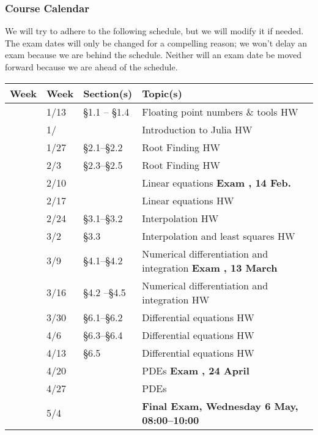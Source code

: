 \documentclass[12pt,fullpage]{article}
\newcounter{qz}\setcounter{qz}{0}
\newcommand{\qz}{%
\setcounter{qz}{\value{qz}+1}
\theqz \,\,}
\newcounter{ex}\setcounter{ex}{0}
\newcommand{\ex}{%
\setcounter{ex}{\value{ex}+1}
Exam \theex}
\newcounter{wk}\setcounter{wk}{0}
\newcommand{\wk}{%
\setcounter{wk}{\value{wk}+1}
\thewk \,\,}
\begin{document}

\subsubsection*{Course Calendar}

We will try to adhere to the following schedule, but we will modify it
if needed. The exam dates will only be changed for a compelling
reason; we won't delay an exam because we are behind the
schedule. Neither will an exam date be moved forward because we are
ahead of the schedule.

\vspace{0.1in}

\begin{center}

\begin{tabular}  {|l|l|l|l|}
\hline
{\bf Week}  & {\bf Week} &  {\bf Section(s)} & {\bf Topic(s)} \\
\hline \hline 
\wk    & 1/13 &    \S1.1 -- \S1.4  & Floating point numbers \& tools \hfill HW \phantom{1}\qz \\
\wk    & 1/ &      & Introduction to Julia  \hfill HW \phantom{1}\qz \\
\wk    & 1/27 &    \S2.1--\S2.2 & Root Finding  \hfill HW \phantom{1}\qz \\
\wk    & 2/3  & \S2.3--\S2.5 &  Root Finding   \hfill HW \phantom{1}\qz \\
\wk    & 2/10 &     &  Linear equations   \hfill \textbf{\ex\-\-, 14 Feb.}  \\
\wk    & 2/17   &  &  Linear equations  \hfill HW \phantom{1}\qz   \\
\wk    & 2/24     & \S3.1--\S3.2 & Interpolation \hfill HW \phantom{1}\qz  \\
\wk   & 3/2   & \S3.3  &   Interpolation and least squares  \hfill HW \phantom{1}\qz \\
\wk  &  3/9    & \S4.1--\S4.2 &  Numerical differentiation and integration \hfill  \textbf{ \ex, 13 March } \\ 
\wk &  3/16     &   \S4.2 --\S4.5 &    Numerical differentiation and integration   \hfill HW \phantom{1}\qz    \hfill \\
\wk  & 3/30  &   \S6.1--\S6.2 & Differential equations \hfill HW \phantom{1} \qz \\
\wk   & 4/6  & \S6.3--\S6.4 & Differential equations \hfill HW \qz  \\
\wk   & 4/13   & \S6.5  & Differential equations \hfill HW \qz  \\
\wk   & 4/20   &    & PDEs  \hfill \textbf{ \ex, 24 April   } \\
\wk   & 4/27    &  & PDEs    \\
\wk   & 5/4       &  &   \hfill \textbf{ Final Exam, Wednesday 6 May, 08:00--10:00} \\ \hline
\end{tabular}
\end{center}
\end{document}
